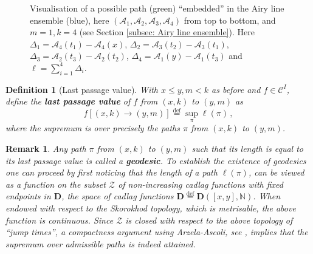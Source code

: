 \documentclass[11pt, reqno]{amsart}
\numberwithin{equation}{section}
\newcounter{dummy} \numberwithin{dummy}{section}
\newtheorem{definition}[dummy]{Definition}
\newtheorem*{remark}{Remark}
\newcommand{\N}{\ensuremath{\mathbb{N}}}
\begin{document}
\begin{figure}[ht]
   \caption{Visualisation of a possible path (\color{Green}green\color{black}) “embedded” in the Airy line ensemble (\color{blue}blue\color{black}), here \((\mathcal{A}_1, \mathcal{A}_2, \mathcal{A}_3, \mathcal{A}_4)\) from top to bottom, and \(m = 1, k = 4\) (see Section \ref{subsec: Airy line ensemble}). Here $\Delta_1 = \mathcal{A}_4(t_1)-\mathcal{A}_4(x)$, $\Delta_2 = \mathcal{A}_3(t_2)-\mathcal{A}_3(t_1)$, $\Delta_3 = \mathcal{A}_2(t_3)-\mathcal{A}_2(t_2)$, $\Delta_4 = \mathcal{A}_1(y)-\mathcal{A}_1(t_3)$ and $\ell = \sum_{i=1}^4 \Delta_i.$}
\end{figure}

\begin{definition}[Last passage value]\label{Definition: last passage}
    With \(x\leq y, m<k\) as before and \(f\in \mathscr{C}^{I}\), define the \textbf{last passage value} of \(f\) from \((x,k)\) to \((y,m)\) as
    \begin{equation*}
    f[(x,k)\to(y,m)] \stackrel{\mathrm{def}}{=}\displaystyle \sup_{\pi}\ell(\pi)\,,
    \end{equation*}
where the supremum is over precisely the paths \(\pi\) from \((x,k)\) to \((y,m)\).
\end{definition}%
\begin{remark}
    Any path \(\pi\) from \((x,k)\) to \((y,m)\) such that its length is equal to its last passage value is called a \textbf{geodesic}. To establish the existence of geodesics one can proceed by first noticing that the length of a path \(\ell(\pi)\), can be viewed as a function on the subset \(\mathcal{Z}\) of non-increasing cadlag functions with fixed endpoints in \(\mathbf{D}\), the space of cadlag functions \(\mathbf{D}\stackrel{\mathrm{def}}{=}\mathbf{D}([x,y], \N)\). When endowed with respect to the  Skorokhod topology, which is metrisable, the above function is continuous. Since \(\mathcal Z\) is closed with respect to the above topology of \textquotedblleft jump times\textquotedblright, a compactness argument using Arzela-Ascoli, see \cite[ch. 3]{billingsley2013convergence}, implies that the supremum over admissible paths is indeed attained.
\end{remark}
\end{document}
